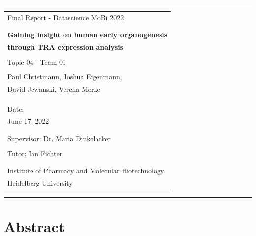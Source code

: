 \documentclass[
]{article}
\author{}
\date{\vspace{-2.5em}}
\begin{document}
{
\setcounter{tocdepth}{2}
\tableofcontents
}
\thispagestyle{empty}
\hrule
\vspace{0.3cm}
\begin{center}
    \vspace{1cm}
  \huge
    \begin{tabular}[c]{l}
    \\
    Final Report - Datascience MoBi 2022\\
    \\
    \\
  \textbf{Gaining insight on human early organogenesis}\\
  \textbf{through TRA expression analysis}\\
    \\
    Topic 04 - Team 01\\
    \\
  Paul Christmann, Joshua Eigenmann,\\ David Jewanski, Verena Merke \\
  \\
  \\
  \\
  \Large Date:\\
  \Large June 17, 2022\\
  \\
  \\
    \large Supervisor:
    \large Dr. Maria Dinkelacker \\
    \\
    \large Tutor:
    \large Ian Fichter \\
    \\
    \\
    \large Institute of Pharmacy and Molecular Biotechnology\\
    \large Heidelberg University 
    \vspace{0.3cm} \\
    \end{tabular}
    \end{center}

\begin{center}\rule{0.5\linewidth}{0.5pt}\end{center}

\newpage

\hypertarget{abstract}{%
\section{Abstract}\label{abstract}}
\end{document}
